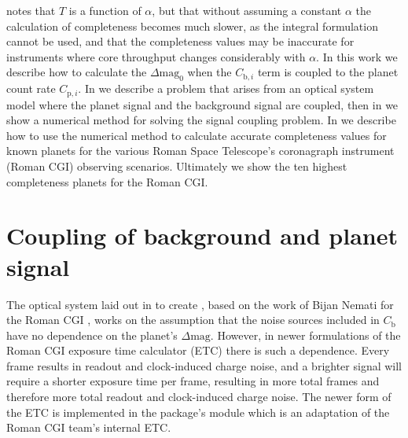 \citet{keithlyOptimalScheduling2020} notes that $T$ is a function of $\alpha$, but
that without assuming a constant $\alpha$ the calculation of completeness becomes
much slower, as the integral formulation cannot be used, and that the
completeness values may be inaccurate for instruments where core
throughput changes considerably with $\alpha$. In this work we describe how to
calculate the $\Delta\textrm{mag}_0$ when the $C_{\textrm{b},i}$ term is
coupled to the planet count rate $C_{\textrm{p},i}$. In  we describe a problem that arises from an optical
system model where the planet signal and the background signal are coupled,
then in  we show a numerical method for
solving the signal coupling problem. In  we describe
how to use the numerical method to calculate accurate completeness values for known
planets for the various Roman Space Telescope's
coronagraph instrument (Roman CGI) observing scenarios. Ultimately we show the ten
highest completeness planets for the Roman CGI.

\section{Coupling of background and planet signal} %
\label{sec:Coupling of background and planet signal}

The optical system laid out in \citet{keithlyOptimalScheduling2020} to create
, based on the work of Bijan Nemati for the Roman CGI
\citep{Nemati2014, nematiSensitivityWFIRST2017, Nemati2020a}, works on the
assumption that the noise sources included in $C_{\textrm{b}}$ have no
dependence on the planet's $\Delta\textrm{mag}$. However, in newer formulations
of the Roman CGI exposure time calculator (ETC) there is such a dependence. Every
frame results in readout and clock-induced charge noise, and a brighter signal
will require a shorter exposure time per frame, resulting in more total frames
and therefore more total readout and clock-induced charge noise. The newer form
of the ETC is implemented in the  package's 
module \citep{savranskyWFIRSTAFTACoronagraphScience2015} which is an adaptation
of the Roman CGI team's internal ETC.


